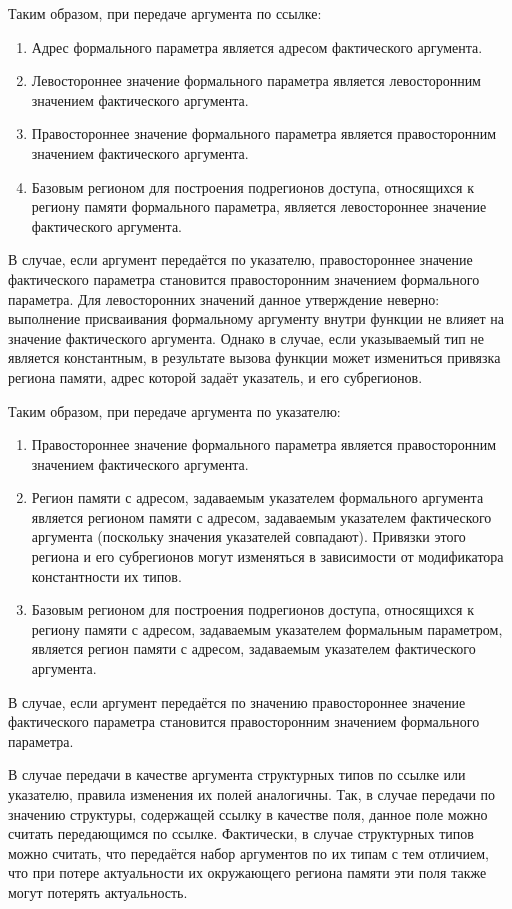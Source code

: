 Таким образом, при передаче аргумента по ссылке:
\begin{enumerate}
 \item Адрес формального параметра является адресом фактического аргумента.
 \item Левостороннее значение формального параметра является левосторонним значением фактического аргумента.
 \item Правостороннее значение формального параметра является правосторонним значением фактического аргумента.
 \item Базовым регионом для построения подрегионов доступа, относящихся к региону памяти формального параметра, является левостороннее значение фактического аргумента.
\end{enumerate}

В случае, если аргумент передаётся по указателю, правостороннее значение фактического параметра становится правосторонним значением формального параметра. Для левосторонних значений данное утверждение неверно: выполнение присваивания формальному аргументу внутри функции не влияет на значение фактического аргумента. Однако в случае, если указываемый тип не является константным, в результате вызова функции может измениться привязка региона памяти, адрес которой задаёт указатель, и его субрегионов.

Таким образом, при передаче аргумента по указателю:
\begin{enumerate}
 \item Правостороннее значение формального параметра является правосторонним значением фактического аргумента.
 \item Регион памяти с адресом, задаваемым указателем формального аргумента является регионом памяти с адресом, задаваемым указателем фактического аргумента (поскольку значения указателей совпадают). Привязки этого региона и его субрегионов могут изменяться в зависимости от модификатора константности их типов.
 \item Базовым регионом для построения подрегионов доступа, относящихся к региону памяти с адресом, задаваемым указателем формальным параметром, является регион памяти с адресом, задаваемым указателем фактического аргумента.
\end{enumerate}

В случае, если аргумент передаётся по значению правостороннее значение фактического параметра становится правосторонним значением формального параметра.

В случае передачи в качестве аргумента структурных типов по ссылке или указателю, правила изменения их полей аналогичны. Так, в случае передачи по значению структуры, содержащей ссылку в качестве поля, данное поле можно считать передающимся по ссылке. Фактически, в случае структурных типов можно считать, что передаётся набор аргументов по их типам с тем отличием, что при потере актуальности их окружающего региона памяти эти поля также могут потерять актуальность.

